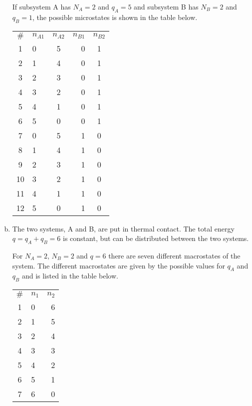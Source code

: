 \documentclass[a4paper,norsk,12pt,oneside]{article}
\begin{document}
\begin{enumerate}[a)]
        If subsystem A has \(N_A = 2\) and \(q_A = 5\) and subsystem B has \(N_B = 2\) and 
        \(q_B = 1\), the possible microstates is shown in the table below. 

        \begin{tabular}{c | l | c | r | c }
            \label{pos_mikro}
            \(\#\) & \(n_{A1}\) & \(n_{A2}\) &\(n_{B1}\) & \(n_{B2}\) \\
            1 & 0 & 5 & 0 & 1 \\
            2 & 1 & 4 & 0 & 1 \\
            3 & 2 & 3 & 0 & 1 \\
            4 & 3 & 2 & 0 & 1 \\
            5 & 4 & 1 & 0 & 1 \\
            6 & 5 & 0 & 0 & 1 \\
            7 & 0 & 5 & 1 & 0 \\
            8 & 1 & 4 & 1 & 0 \\
            9 & 2 & 3 & 1 & 0 \\
            10 & 3 & 2 & 1 & 0 \\
            11 & 4 & 1 & 1 & 0 \\
            12 & 5 & 0 & 1 & 0 \\
            \end{tabular}

    \item

        The two systems, A and B, are put in thermal contact. The total energy
        \(q = q_A + q_B = 6\) is constant, but can be distributed between the two
        systems.

        For \(N_A = 2\),  \(N_B = 2\) and \(q = 6\) there are seven different 
        macrostates of the system. The different macrostates are given by the
        possible values for \(q_A\) and \(q_B\) and is listed in the table below.

        \begin{tabular}{c | l | r}
            \label{pos_mikro}
            \(\#\) & \(n_1\) & \(n_2\) \\
            1 & 0 & 6 \\
            2 & 1 & 5 \\
            3 & 2 & 4 \\
            4 & 3 & 3 \\
            5 & 4 & 2 \\
            6 & 5 & 1 \\
            7 & 6 & 0 \\
            \end{tabular}


\end{enumerate}
\end{document}
